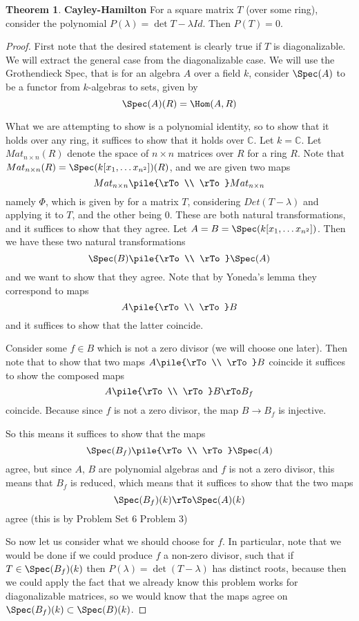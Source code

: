 \documentclass[12 pt]{article}
\theoremstyle{definition}
\newtheorem{theorem}{Theorem}[section]
\newcommand\cc{\mathbb{C}}
\begin{document}
\begin{theorem} \textbf{Cayley-Hamilton} For a square matrix $T$ (over some ring), consider the polynomial $P(\lambda)=\det{T-\lambda Id}$. Then $P(T)=0$.
\end{theorem}
\begin{proof}
First note that the desired statement is clearly true if $T$ is diagonalizable. We will extract the general case from the diagonalizable case. We will use the Grothendieck Spec, that is for an algebra $A$ over a field $k$, consider $\Spec(A)$ to be a functor from $k$-algebras to sets, given by
\[\Spec(A)(R)=\Hom(A,R)\]

What we are attempting to show is a polynomial identity, so to show that it holds over any ring, it suffices to show that it holds over $\cc$. Let $k=\cc$.  Let $Mat_{n\times n}(R)$ denote the space of $n \times n$ matrices over $R$ for a ring $R$. Note that $Mat_{n \times n}(R)=\Spec(k[x_1, \ldots x_{n^2}])(R)$, and we are given two maps
\[Mat_{n \times n} \pile{\rTo \\ \rTo} Mat_{n \times n}\]
namely $\Phi$, which is given by for a matrix $T$, considering $Det(T-\lambda)$ and applying it to $T$, and the other being 0. These are both natural transformations, and it suffices to show that they agree. Let $A=B=\Spec(k[x_1, \ldots x_{n^2}])$. Then we have these two natural transformations
\[\Spec(B) \pile{\rTo \\ \rTo} \Spec(A)\]
and we want to show that they agree. Note that by Yoneda's lemma they correspond to maps
\[A \pile{\rTo \\ \rTo} B\]
and it suffices to show that the latter coincide.

Consider some $f \in B$ which is not a zero divisor (we will choose one later). Then note that to show that two maps $A \pile{\rTo \\ \rTo} B$ coincide it suffices to show the composed maps
\[A \pile{\rTo \\ \rTo} B \rTo B_f\]
coincide. Because since $f$ is not a zero divisor, the map $B \to B_f$ is injective.

So this means it suffices to show that the maps
\[\Spec(B_f) \pile{\rTo \\ \rTo} \Spec(A)\]
agree, but since $A$, $B$ are polynomial algebras and $f$ is not a zero divisor, this means that $B_f$ is reduced, which means that it suffices to show that the two maps
\[\Spec(B_f)(k) \rTo \Spec(A)(k)\]
agree (this is by Problem Set 6 Problem 3)

So now let us consider what we should choose for $f$. In particular, note that we would be done if we could produce $f$ a non-zero divisor, such that if $T \in \Spec(B_f)(k)$ then $P(\lambda)=\det(T-\lambda)$ has distinct roots, because then we could apply the fact that we already know this problem works for diagonalizable matrices, so we would know that the maps agree on $\Spec(B_f)(k) \subset \Spec(B)(k)$.


\end{proof}
\end{document}
